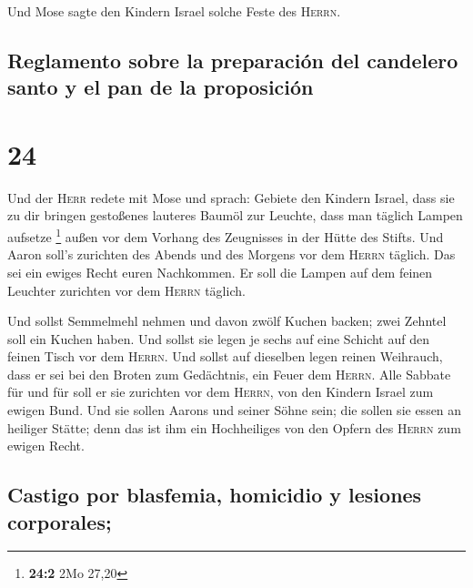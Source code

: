  Und Mose sagte den Kindern Israel solche Feste des
\textsc{Herrn}.

\hypertarget{reglamento-sobre-la-preparaciuxf3n-del-candelero-santo-y-el-pan-de-la-proposiciuxf3n}{%
\subsection{Reglamento sobre la preparación del candelero santo y el pan
de la
proposición}\label{reglamento-sobre-la-preparaciuxf3n-del-candelero-santo-y-el-pan-de-la-proposiciuxf3n}}

\hypertarget{section-23}{%
\section{24}\label{section-23}}

 Und der \textsc{Herr} redete mit Mose und sprach:
 Gebiete den Kindern Israel, dass sie zu dir bringen
gestoßenes lauteres Baumöl zur Leuchte, dass man täglich Lampen aufsetze
\footnote{\textbf{24:2} 2Mo 27,20}  außen vor dem Vorhang
des Zeugnisses in der Hütte des Stifts. Und Aaron soll's zurichten des
Abends und des Morgens vor dem \textsc{Herrn} täglich. Das sei ein
ewiges Recht euren Nachkommen.  Er soll die Lampen auf dem
feinen Leuchter zurichten vor dem \textsc{Herrn} täglich.

 Und sollst Semmelmehl nehmen und davon zwölf Kuchen
backen; zwei Zehntel soll ein Kuchen haben.  Und sollst
sie legen je sechs auf eine Schicht auf den feinen Tisch vor dem
\textsc{Herrn}.  Und sollst auf dieselben legen reinen
Weihrauch, dass er sei bei den Broten zum Gedächtnis, ein Feuer dem
\textsc{Herrn}.  Alle Sabbate für und für soll er sie
zurichten vor dem \textsc{Herrn}, von den Kindern Israel zum ewigen
Bund.  Und sie sollen Aarons und seiner Söhne sein; die
sollen sie essen an heiliger Stätte; denn das ist ihm ein Hochheiliges
von den Opfern des \textsc{Herrn} zum ewigen Recht.

\hypertarget{castigo-por-blasfemia-homicidio-y-lesiones-corporales}{%
\subsection{Castigo por blasfemia, homicidio y lesiones
corporales;}\label{castigo-por-blasfemia-homicidio-y-lesiones-corporales}}

